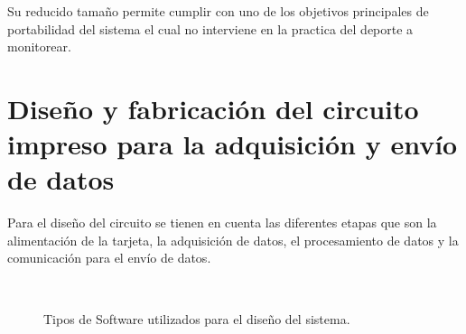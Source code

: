 Su reducido tamaño permite cumplir con uno de los objetivos principales de portabilidad del sistema el cual no interviene en la practica del deporte a monitorear. 

\section{Diseño y fabricación del circuito impreso para la adquisición y envío de datos}

Para el diseño del circuito se tienen en cuenta las diferentes etapas que son la alimentación de la tarjeta, la adquisición de datos, el procesamiento de datos y la comunicación para el envío de datos.

\begin{figure}[H]
 \centering
    \\
 \caption{Tipos de Software utilizados para el diseño del sistema.}
 \label{fig:Software}
\end{figure}

